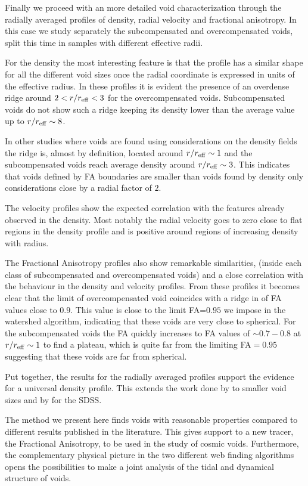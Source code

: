 \documentclass[a4,useAMS,usenatbib,usegraphicx]{mn2e}
\begin{document}
Finally we proceed with an more detailed void characterization
through the radially averaged profiles of density, radial velocity and
fractional anisotropy. 
In this case we study separately the subcompensated and
overcompensated voids, split this time in samples with different
effective radii. 

For the density the most interesting feature is that the  profile has
a similar shape for all the different void sizes once the radial
coordinate is expressed in units of the effective radius.  
In these profiles it is evident the presence of an overdense ridge
around $2<r/r_{\rm eff}<3$ for the overcompensated voids.
Subcompensated voids do not show such a ridge keeping its density
lower than the average value up to $r/r_{\rm eff}\sim 8$.

In other studies where voids are found using considerations on the
density fields the ridge is, almost by definition, located around
$r/r_{\rm eff}\sim 1$ and the subcompensated voids reach average
density around $r/r_{\rm eff}\sim 3$. 
This indicates that voids defined by FA boundaries are smaller  than
voids found by density only considerations close by a radial factor of
$2$.   

The velocity profiles show the expected correlation with the features
already observed in the density.
Most notably the radial velocity goes to zero close to flat regions in
the density profile and is positive around regions of increasing
density with radius.  

The Fractional Anisotropy profiles also show remarkable similarities,
(inside each class of subcompensated and overcompensated voids)
and a close correlation with the behaviour in the density and velocity
profiles. 
From these profiles it becomes clear that the limit of overcompensated
void coincides with a ridge in of FA values close to $0.9$. 
This value is close to the limit FA=$0.95$ we impose in the watershed
algorithm, indicating that these voids are very close to spherical.
For the subcompensated voids the FA quickly increases to FA values of 
$\sim 0.7-0.8$ at $r/r_{\rm eff}\sim 1$ to find a plateau, which is
quite far from the limiting FA$=0.95$ suggesting that these voids are
far from spherical. 

Put together, the results for the radially averaged profiles support the 
evidence for a universal density profile.  
This extends the work done
by \cite{Hamaus14} to smaller void sizes and by \cite{Ceccarelli13} for
the SDSS.

The method we present here finds voids with reasonable properties
compared to different results published in the literature. 
This gives support to a new tracer, the Fractional Anisotropy, to be
used in the study of cosmic voids. 
Furthermore, the complementary physical picture in the two different
web finding algorithms opens the possibilities to make a joint
analysis of the tidal and dynamical structure of voids. 
\end{document}
